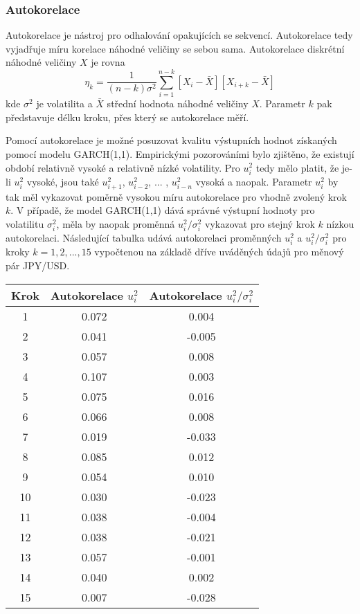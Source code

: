 \documentclass[a4paper]{book}
\begin{document}
\subsubsection{Autokorelace}

Autokorelace je nástroj pro odhalování opakujících se sekvencí. Autokorelace tedy vyjadřuje míru korelace náhodné veličiny se sebou sama. Autokorelace diskrétní náhodné veličiny $X$ je rovna
\begin{equation*}
\eta_k = \frac{1}{(n-k)\sigma^2}\sum_{i=1}^{n-k}[X_i - \bar{X}][X_{i+k}-\bar{X}]
\end{equation*}
kde $\sigma^2$ je volatilita a $\bar{X}$ střední hodnota náhodné veličiny $X$. Parametr $k$ pak představuje délku kroku, přes který se autokorelace měří.

Pomocí autokorelace je možné posuzovat kvalitu výstupních hodnot získaných pomocí modelu GARCH(1,1). Empirickými pozorováními bylo zjištěno, že existují období relativně vysoké a relativně nízké volatility. Pro $u_i^2$ tedy mělo platit, že je-li $u_i^2$ vysoké, jsou také $u_{i+1}^2$, $u_{i-2}^2$, ... , $u_{i-n}^2$ vysoká a naopak. Parametr $u_i^2$ by tak měl vykazovat poměrně vysokou míru autokorelace pro vhodně zvolený krok $k$. V případě, že model GARCH(1,1) dává správné výstupní hodnoty pro volatilitu $\sigma_i^2$, měla by naopak proměnná $u_i^2/\sigma_i^2$ vykazovat pro stejný krok $k$ nízkou autokorelaci. Následující tabulka udává autokorelaci proměnných $u_i^2$ a $u_i^2/\sigma_i^2$ pro kroky $k = 1, 2, ..., 15$ vypočtenou na základě dříve uváděných údajů pro měnový pár JPY/USD.
\begin{center}
\begin{tabular}{c c c}
\textbf{Krok} &
\textbf{Autokorelace $u_i^2$} &
\textbf{Autokorelace $u_i^2/\sigma_i^2$}\\
\hline
 1 & 0.072 &  0.004\\
 2 & 0.041 & -0.005\\
 3 & 0.057 &  0.008\\
 4 & 0.107 &  0.003\\
 5 & 0.075 &  0.016\\
 6 & 0.066 &  0.008\\
 7 & 0.019 & -0.033\\
 8 & 0.085 &  0.012\\
 9 & 0.054 &  0.010\\
10 & 0.030 & -0.023\\
11 & 0.038 & -0.004\\
12 & 0.038 & -0.021\\
13 & 0.057 & -0.001\\
14 & 0.040 &  0.002\\
15 & 0.007 & -0.028\\
\end{tabular}
\end{center}
\end{document}
